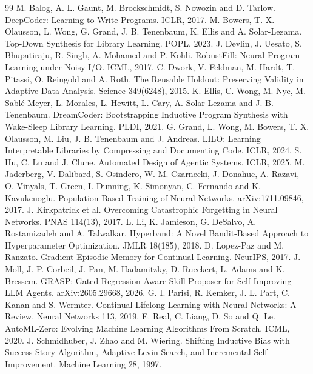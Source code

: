 \documentclass[11pt]{article}
\begin{document}
\begin{thebibliography}{99}
 M. Balog, A. L. Gaunt, M. Brockschmidt, S. Nowozin and D. Tarlow. DeepCoder: Learning to Write Programs. ICLR, 2017.
 M. Bowers, T. X. Olausson, L. Wong, G. Grand, J. B. Tenenbaum, K. Ellis and A. Solar-Lezama. Top-Down Synthesis for Library Learning. POPL, 2023.
 J. Devlin, J. Uesato, S. Bhupatiraju, R. Singh, A. Mohamed and P. Kohli. RobustFill: Neural Program Learning under Noisy I/O. ICML, 2017.
 C. Dwork, V. Feldman, M. Hardt, T. Pitassi, O. Reingold and A. Roth. The Reusable Holdout: Preserving Validity in Adaptive Data Analysis. Science 349(6248), 2015.
 K. Ellis, C. Wong, M. Nye, M. Sabl\'e-Meyer, L. Morales, L. Hewitt, L. Cary, A. Solar-Lezama and J. B. Tenenbaum. DreamCoder: Bootstrapping Inductive Program Synthesis with Wake-Sleep Library Learning. PLDI, 2021.
 G. Grand, L. Wong, M. Bowers, T. X. Olausson, M. Liu, J. B. Tenenbaum and J. Andreas. LILO: Learning Interpretable Libraries by Compressing and Documenting Code. ICLR, 2024.
 S. Hu, C. Lu and J. Clune. Automated Design of Agentic Systems. ICLR, 2025.
 M. Jaderberg, V. Dalibard, S. Osindero, W. M. Czarnecki, J. Donahue, A. Razavi, O. Vinyals, T. Green, I. Dunning, K. Simonyan, C. Fernando and K. Kavukcuoglu. Population Based Training of Neural Networks. arXiv:1711.09846, 2017.
 J. Kirkpatrick et al. Overcoming Catastrophic Forgetting in Neural Networks. PNAS 114(13), 2017.
 L. Li, K. Jamieson, G. DeSalvo, A. Rostamizadeh and A. Talwalkar. Hyperband: A Novel Bandit-Based Approach to Hyperparameter Optimization. JMLR 18(185), 2018.
 D. Lopez-Paz and M. Ranzato. Gradient Episodic Memory for Continual Learning. NeurIPS, 2017.
 J. Moll, J.-P. Corbeil, J. Pan, M. Hadamitzky, D. Rueckert, L. Adams and K. Bressem. GRASP: Gated Regression-Aware Skill Proposer for Self-Improving LLM Agents. arXiv:2605.29668, 2026.
 G. I. Parisi, R. Kemker, J. L. Part, C. Kanan and S. Wermter. Continual Lifelong Learning with Neural Networks: A Review. Neural Networks 113, 2019.
 E. Real, C. Liang, D. So and Q. Le. AutoML-Zero: Evolving Machine Learning Algorithms From Scratch. ICML, 2020.
 J. Schmidhuber, J. Zhao and M. Wiering. Shifting Inductive Bias with Success-Story Algorithm, Adaptive Levin Search, and Incremental Self-Improvement. Machine Learning 28, 1997.

\end{thebibliography}
\end{document}
